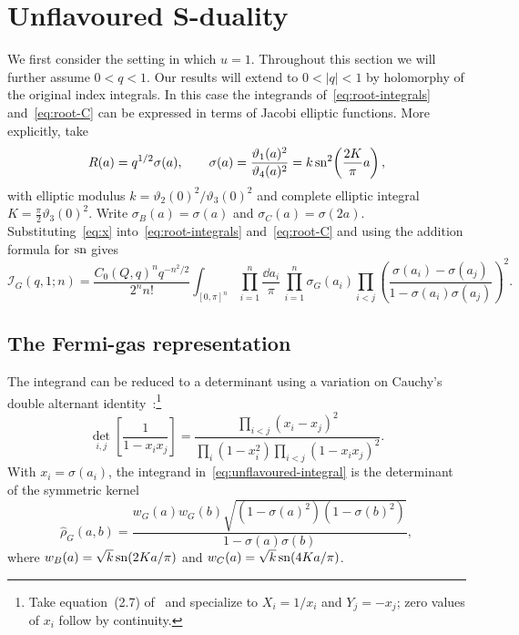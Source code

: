 \section{Unflavoured S-duality}
\label{sec:unflavoured}
We first consider the setting in which $u=1$.
Throughout this section we will further assume $0<q<1$. Our results will extend
to $0<|q|<1$ by holomorphy of the original index integrals.
In this case the integrands of~\eqref{eq:root-integrals} and~\eqref{eq:root-C}
can be expressed in terms of Jacobi elliptic functions.
More explicitly, take
\begin{equation}
  R(a)=q^{1/2}\sigma(a),\qquad
  \sigma(a)=\frac{\vartheta_1(a)^2}{\vartheta_4(a)^2}
  =k\operatorname{sn}^2\!\left(\frac{2K}{\pi}a\right),
  \label{eq:x}
\end{equation}
with elliptic modulus $k=\vartheta_2(0)^2/\vartheta_3(0)^2$ and complete
elliptic integral $K=\frac{\pi}{2}\vartheta_3(0)^2$. Write
$\sigma_B(a)=\sigma(a)$ and $\sigma_C(a)=\sigma(2a)$.
Substituting~\eqref{eq:x} into~\eqref{eq:root-integrals} and~\eqref{eq:root-C}
and using the addition formula for $\operatorname{sn}$ gives
\begin{equation}
  \mathcal I_G(q,1;n)=\frac{C_0(Q,q)^n q^{-n^2/2}}{2^n n!}
  \int_{[0,\pi]^n}\prod_{i=1}^n\frac{\dd a_i}{\pi}\,
  \prod_{i=1}^n\sigma_G(a_i)
  \prod_{i<j}\left(\frac{\sigma(a_i)-\sigma(a_j)}
  {1-\sigma(a_i)\sigma(a_j)}\right)^2.
  \label{eq:unflavoured-integral}
\end{equation}

\subsection{The Fermi-gas representation}

The integrand can be reduced to a determinant using a variation on Cauchy's
double alternant identity~\cite{Krattenthaler:1999}:\footnote{Take
equation~(2.7) of~\cite{Krattenthaler:1999} and specialize to $X_i=1/x_i$ and
$Y_j=-x_j$; zero values of $x_i$ follow by continuity.}
\begin{equation}
  \det_{i,j}\!\left[\frac{1}{1-x_ix_j}\right]
  =\frac{\prod_{i<j}(x_i-x_j)^2}
  {\prod_i(1-x_i^2)\prod_{i<j}(1-x_ix_j)^2}.
  \label{eq:cauchy}
\end{equation}
With $x_i=\sigma(a_i)$, the integrand in~\eqref{eq:unflavoured-integral} is the
determinant of the symmetric kernel
\begin{equation}
  \widehat\rho_G(a,b)
  =\frac{w_G(a)w_G(b)
    \sqrt{(1-\sigma(a)^2)(1-\sigma(b)^2)}}
  {1-\sigma(a)\sigma(b)},
  \label{eq:full-kernel}
\end{equation}
where $w_B(a)=\sqrt{k}\operatorname{sn}(2Ka/\pi)$ and $w_C(a)=\sqrt{k}\operatorname{sn}(4Ka/\pi)$.

